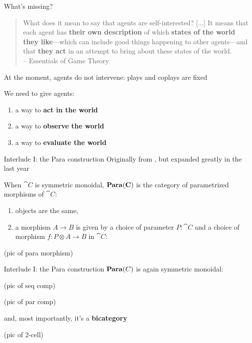 \begin{frame}{What's missing?}
	\begin{quotation}
		What does it mean to say that agents are self-interested? [...] It means that each agent has \textbf{their own description} of which \textbf{states of the world they like}—which can include good things happening to other agents—and that \textbf{they act} in an attempt to bring about these states of the world.\\
		{\color{colornote}-- Essentials of Game Theory \cite{leyton2008essentials}}
	\end{quotation}

	At the moment, agents do not intervene: plays and coplays are fixed

	\vfill
	We need to give agents:
	\begin{enumerate}
		\item a way to \textbf{act in the world}
		\item a way to \textbf{observe the world}
		\item a way to \textbf{evaluate the world}
	\end{enumerate}
\end{frame}

\begin{frame}{Interlude I: the Para construction}
	Originally from \cite{fong2019backprop}, but expanded greatly in the last year

	\begin{definition}
		When $\cat C$ is symmetric monoidal, $\mathbf{Para}(\mathbf{C})$ is the category of parametrized morphisms of $\cat C$:
		\begin{enumerate}
			\item objects are the same,
			\item a morphism $A \to B$ is given by a choice of parameter $P : \cat C$ and a choice of morphism $f:P \otimes A \to B$ in $\cat C$:
		\end{enumerate}
	\end{definition}

	(pic of para morphism)
\end{frame}


\begin{frame}{Interlude I: the Para construction}
	$\mathbf{Para}(C)$ is again symmetric monoidal:

	(pic of seq comp)

	(pic of par comp)

	and, most importantly, it's a \textbf{bicategory}

	(pic of 2-cell)
\end{frame}

